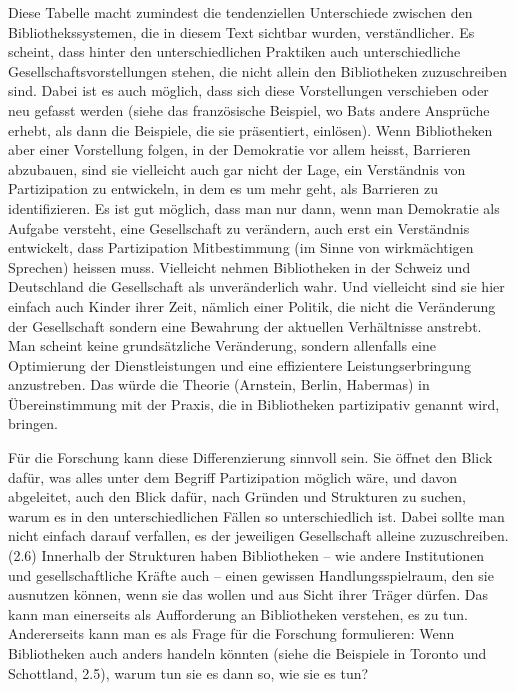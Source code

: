 \documentclass[a4paper,
fontsize=11pt,
oneside,
numbers=noperiodatend,
parskip=half-,
bibliography=totoc,
final
]{scrartcl}
\begin{document}
Diese Tabelle macht zumindest die tendenziellen Unterschiede zwischen
den Bibliothekssystemen, die in diesem Text sichtbar wurden,
verständlicher. Es scheint, dass hinter den unterschiedlichen Praktiken
auch unterschiedliche Gesellschaftsvorstellungen stehen, die nicht
allein den Bibliotheken zuzuschreiben sind. Dabei ist es auch möglich,
dass sich diese Vorstellungen verschieben oder neu gefasst werden (siehe
das französische Beispiel, wo Bats andere Ansprüche erhebt, als dann die
Beispiele, die sie präsentiert, einlösen). Wenn Bibliotheken aber einer
Vorstellung folgen, in der Demokratie vor allem heisst, Barrieren
abzubauen, sind sie vielleicht auch gar nicht der Lage, ein Verständnis
von Partizipation zu entwickeln, in dem es um mehr geht, als Barrieren
zu identifizieren. Es ist gut möglich, dass man nur dann, wenn man
Demokratie als Aufgabe versteht, eine Gesellschaft zu verändern, auch
erst ein Verständnis entwickelt, dass Partizipation Mitbestimmung (im
Sinne von wirkmächtigen Sprechen) heissen muss. Vielleicht nehmen
Bibliotheken in der Schweiz und Deutschland die Gesellschaft als
unveränderlich wahr. Und vielleicht sind sie hier einfach auch Kinder
ihrer Zeit, nämlich einer Politik, die nicht die Veränderung der
Gesellschaft sondern eine Bewahrung der aktuellen Verhältnisse anstrebt.
Man scheint keine grundsätzliche Veränderung, sondern allenfalls eine
Optimierung der Dienstleistungen und eine effizientere
Leistungserbringung anzustreben. Das würde die Theorie (Arnstein,
Berlin, Habermas) in Übereinstimmung mit der Praxis, die in Bibliotheken
partizipativ genannt wird, bringen.

Für die Forschung kann diese Differenzierung sinnvoll sein. Sie öffnet
den Blick dafür, was alles unter dem Begriff Partizipation möglich wäre,
und davon abgeleitet, auch den Blick dafür, nach Gründen und Strukturen
zu suchen, warum es in den unterschiedlichen Fällen so unterschiedlich
ist. Dabei sollte man nicht einfach darauf verfallen, es der jeweiligen
Gesellschaft alleine zuzuschreiben. (2.6) Innerhalb der Strukturen haben
Bibliotheken -- wie andere Institutionen und gesellschaftliche Kräfte
auch -- einen gewissen Handlungsspielraum, den sie ausnutzen können,
wenn sie das wollen und aus Sicht ihrer Träger dürfen. Das kann man
einerseits als Aufforderung an Bibliotheken verstehen, es zu tun.
Andererseits kann man es als Frage für die Forschung formulieren: Wenn
Bibliotheken auch anders handeln könnten (siehe die Beispiele in Toronto
und Schottland, 2.5), warum tun sie es dann so, wie sie es tun?
\end{document}
